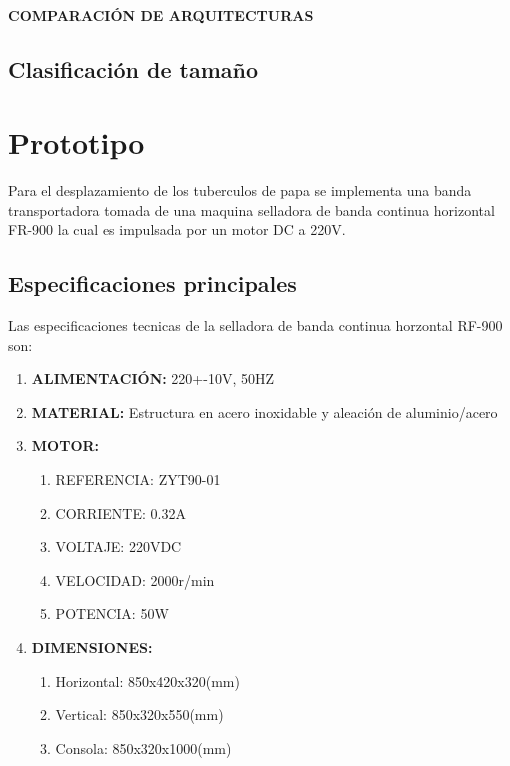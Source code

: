 			
			\subsubsection{\MakeUppercase{Comparación de arquitecturas}}
		
	\section{Clasificación de tamaño}
	
\chapter{Prototipo}
	Para el desplazamiento de los tuberculos de papa se implementa una banda transportadora tomada de una maquina selladora de banda continua horizontal FR-900 la cual es impulsada por un motor DC a 220V.
	
	\section{Especificaciones principales}
	Las especificaciones tecnicas de la selladora de banda continua horzontal RF-900 son:
	\begin{enumerate}
		\item\textbf{ALIMENTACIÓN:} 220+-10V, 50HZ
		\item\textbf{MATERIAL:} Estructura en acero inoxidable y aleación de aluminio/acero
		\item \textbf{MOTOR:}
			\begin{enumerate}
				\item{REFERENCIA:} ZYT90-01
				\item{CORRIENTE:} 0.32A
				\item{VOLTAJE:} 220VDC
				\item{VELOCIDAD:} 2000r/min
				\item{POTENCIA:} 50W				
			\end{enumerate}
		\item \textbf{DIMENSIONES:}
			\begin{enumerate}
				\item Horizontal: 850x420x320(mm)
				\item Vertical: 850x320x550(mm)
				\item Consola: 850x320x1000(mm)
			\end{enumerate}
	\end{enumerate}
	
\newpage
